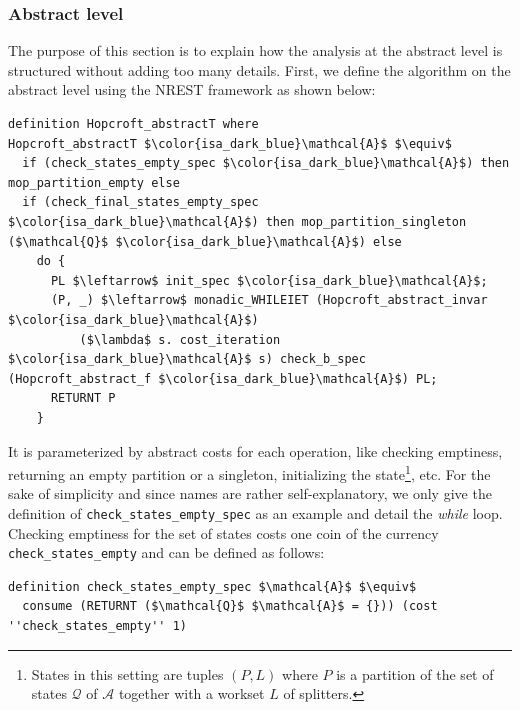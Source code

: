 \documentclass[12pt, a4 paper]{article}
\theoremstyle{definition}
\begin{document}
\subsubsection{Abstract level}
The purpose of this section is to explain how the analysis at the abstract level is structured without adding too many details.
First, we define the algorithm on the abstract level using the NREST framework as shown below:
\begin{lstlisting}[language=Isabelle]
definition Hopcroft_abstractT where
Hopcroft_abstractT $\color{isa_dark_blue}\mathcal{A}$ $\equiv$
  if (check_states_empty_spec $\color{isa_dark_blue}\mathcal{A}$) then mop_partition_empty else 
  if (check_final_states_empty_spec $\color{isa_dark_blue}\mathcal{A}$) then mop_partition_singleton ($\mathcal{Q}$ $\color{isa_dark_blue}\mathcal{A}$) else
    do {
      PL $\leftarrow$ init_spec $\color{isa_dark_blue}\mathcal{A}$;
      (P, _) $\leftarrow$ monadic_WHILEIET (Hopcroft_abstract_invar $\color{isa_dark_blue}\mathcal{A}$) 
          ($\lambda$ s. cost_iteration $\color{isa_dark_blue}\mathcal{A}$ s) check_b_spec (Hopcroft_abstract_f $\color{isa_dark_blue}\mathcal{A}$) PL;
      RETURNT P
    }
\end{lstlisting}
It is parameterized by abstract costs for each operation, like checking emptiness, returning an empty partition or a singleton, initializing the state\footnote{States in this setting are tuples $(P, L)$ where $P$ is a partition of the set of states $\mathcal{Q}$ of $\mathcal{A}$ together with a workset $L$ of splitters.}, etc.
For the sake of simplicity and since names are rather self-explanatory, we only give the definition of \texttt{check\_states\_empty\_spec} as an example and detail the \textit{while} loop. Checking emptiness for the set of states costs one coin of the currency \texttt{check\_states\_empty} and can be defined as follows:
\begin{lstlisting}[language=Isabelle]
definition check_states_empty_spec $\mathcal{A}$ $\equiv$
  consume (RETURNT ($\mathcal{Q}$ $\mathcal{A}$ = {})) (cost ''check_states_empty'' 1)
\end{lstlisting}
\end{document}
